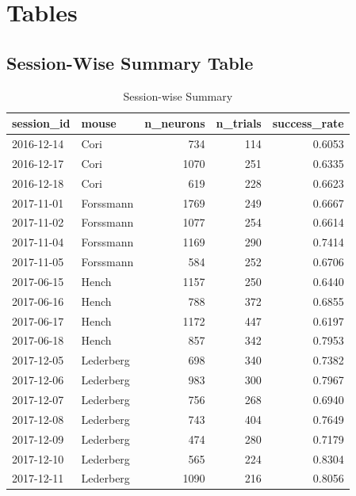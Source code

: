 \documentclass{article}
\begin{document}
	\section{Tables}
	\subsection{Session-Wise Summary Table}
	\begin{table}[htbp]
		\centering
		\begin{adjustbox}{width=\textwidth}  %
			\begin{tabular}{llrrr}
				\toprule
				\textbf{session\_id} & \textbf{mouse} & \textbf{n\_neurons} & \textbf{n\_trials} & \textbf{success\_rate} \\
				\midrule
				2016-12-14 & Cori       &  734 & 114 & 0.6053 \\
				2016-12-17 & Cori       & 1070 & 251 & 0.6335 \\
				2016-12-18 & Cori       &  619 & 228 & 0.6623 \\
				2017-11-01 & Forssmann  & 1769 & 249 & 0.6667 \\
				2017-11-02 & Forssmann  & 1077 & 254 & 0.6614 \\
				2017-11-04 & Forssmann  & 1169 & 290 & 0.7414 \\
				2017-11-05 & Forssmann  &  584 & 252 & 0.6706 \\
				2017-06-15 & Hench      & 1157 & 250 & 0.6440 \\
				2017-06-16 & Hench      &  788 & 372 & 0.6855 \\
				2017-06-17 & Hench      & 1172 & 447 & 0.6197 \\
				2017-06-18 & Hench      &  857 & 342 & 0.7953 \\
				2017-12-05 & Lederberg  &  698 & 340 & 0.7382 \\
				2017-12-06 & Lederberg  &  983 & 300 & 0.7967 \\
				2017-12-07 & Lederberg  &  756 & 268 & 0.6940 \\
				2017-12-08 & Lederberg  &  743 & 404 & 0.7649 \\
				2017-12-09 & Lederberg  &  474 & 280 & 0.7179 \\
				2017-12-10 & Lederberg  &  565 & 224 & 0.8304 \\
				2017-12-11 & Lederberg  & 1090 & 216 & 0.8056 \\
				\bottomrule
			\end{tabular}
		\end{adjustbox}
		\caption{Session-wise Summary}
		\label{tab:session_summary}
	\end{table}
\end{document}
